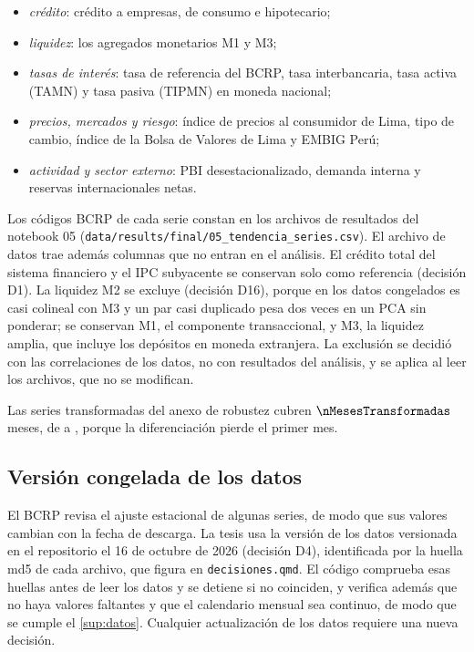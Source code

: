 \begin{itemize}[leftmargin=*]
  \item \emph{crédito}: crédito a empresas, de consumo e hipotecario;
  \item \emph{liquidez}: los agregados monetarios M1 y M3;
  \item \emph{tasas de interés}: tasa de referencia del BCRP, tasa interbancaria, tasa activa (TAMN)
    y tasa pasiva (TIPMN) en moneda nacional;
  \item \emph{precios, mercados y riesgo}: índice de precios al consumidor de Lima, tipo de cambio,
    índice de la Bolsa de Valores de Lima y EMBIG Perú;
  \item \emph{actividad y sector externo}: PBI desestacionalizado, demanda interna y reservas
    internacionales netas.
\end{itemize}

Los códigos BCRP de cada serie constan en los archivos de resultados del notebook 05
(\texttt{data/results/final/05\_tendencia\_series.csv}). El archivo de datos trae además columnas
que no entran en el análisis. El crédito total del sistema financiero y el IPC subyacente se
conservan solo como referencia (decisión D1). La liquidez M2 se excluye (decisión D16), porque en
los datos congelados es casi colineal con M3 y un par casi duplicado pesa dos veces en un PCA sin
ponderar; se conservan M1, el componente transaccional, y M3, la liquidez amplia, que incluye los
depósitos en moneda extranjera. La exclusión se decidió con las correlaciones de los datos, no con
resultados del análisis, y se aplica al leer los archivos, que no se modifican.

Las series transformadas del anexo de robustez cubren $\nMesesTransformadas$ meses, de
\fechaInicioTransformadas{} a \fechaFinDatos{}, porque la diferenciación pierde el primer mes.

\subsection{Versión congelada de los datos}

El BCRP revisa el ajuste estacional de algunas series, de modo que sus valores cambian con la fecha
de descarga. La tesis usa la versión de los datos versionada en el repositorio el 16 de octubre de
2026 (decisión D4), identificada por la huella md5 de cada archivo, que figura en
\texttt{decisiones.qmd}. El código comprueba esas huellas antes de leer los datos y se detiene si
no coinciden, y verifica además que no haya valores faltantes y que el calendario mensual sea
continuo, de modo que se cumple el \cref{sup:datos}. Cualquier actualización de los datos requiere
una nueva decisión.

